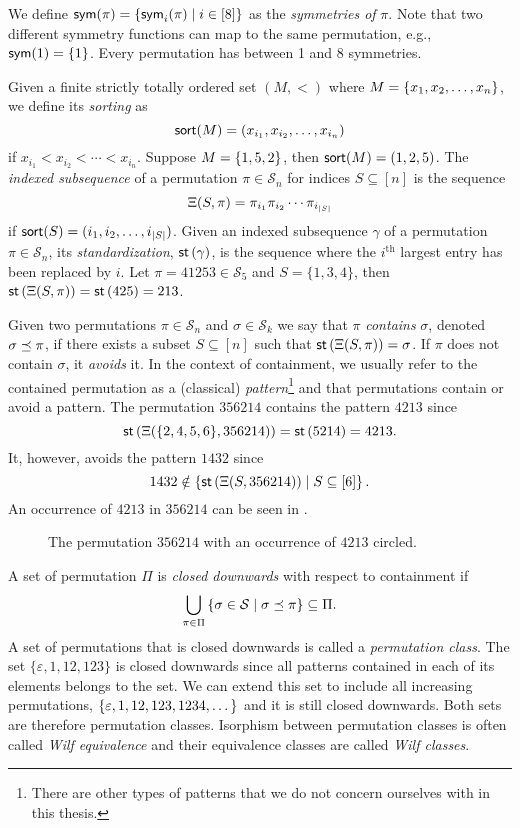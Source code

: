 We define $\textsf{sym}(\pi) = \left\{\textsf{sym}_i(\pi) \mid i \in [8]\right\}$ as the \emph{symmetries of} $\pi$. Note that two different symmetry functions can map to the same permutation, e.g., $\textsf{sym}(1) = \left\{1\right\}$. Every permutation has between 1 and 8 symmetries.

Given a finite strictly totally ordered set $(M, <)$ where $M = \left\{x_1,x_2,\dotsc,x_n\right\}$, we define its \emph{sorting} as
\[
    \textsf{sort}(M) = (x_{i_1},x_{i_2},\dotsc,x_{i_n})
\]
if $x_{i_1} < x_{i_2} < \dotsm < x_{i_n}$. Suppose $M=\left\{1,5,2\right\}$, then $\textsf{sort}(M) = (1,2,5)$. The \emph{indexed subsequence} of a permutation $\pi \in \mathcal{S}_n$ for indices $S\subseteq [n]$ is the sequence
\[
    \Xi(S,\pi)=\pi_{i_1} \pi_{i_2} \dotsm \pi_{i_{|S|}}
\]
if $\textsf{sort}(S) = (i_1,i_2,\dotsc,i_{|S|})$. Given an indexed subsequence $\gamma$ of a permutation $\pi \in \mathcal{S}_n$, its \emph{standardization}, $\textsf{st}\left(\gamma\right)$, is the sequence where the $i^\text{th}$ largest entry has been replaced by $i$. Let $\pi = 41253 \in \mathcal{S}_5$ and $S=\{1,3,4\}$, then $\textsf{st}\left(\Xi(S,\pi)\right) = \textsf{st}\left(425\right) = 213$.

Given two permutations $\pi \in \mathcal{S}_n$ and $\sigma \in \mathcal{S}_k$ we say that $\pi$ \emph{contains} $\sigma$, denoted $\sigma \preceq \pi$, if there exists a subset $S \subseteq [n]$ such that $\textsf{st}\left(\Xi(S,\pi)\right) = \sigma$. If $\pi$ does not contain $\sigma$, it \emph{avoids} it. In the context of containment, we usually refer to the contained permutation as a (classical) \emph{pattern}\footnote{There are other types of patterns that we do not concern ourselves with in this thesis.} and that permutations contain or avoid a pattern. The permutation $356214$ contains the pattern $4213$ since
\[
    \textsf{st}\left(\Xi(\{2, 4, 5, 6\},356214)\right) = \textsf{st}\left(5214\right) = 4213.
\]
It, however, avoids the pattern $1432$ since
\[
    1432 \notin \left\{\textsf{st}\left(\Xi(S,356214)\right) \mid S \subseteq [6]\right\}.
\]
An occurrence of $4213$ in $356214$ can be seen in .

\begin{figure}[ht!]
    \centering
    
    \caption{The permutation $356214$ with an occurrence of $4213$ circled.}
    \label{fig:pattern_containment}
\end{figure}

A set of permutation $\Pi$ is \emph{closed downwards} with respect to containment if 
\[
    \bigcup_{\pi \in \Pi}\left\{\sigma \in \mathcal{S} \mid \sigma \preceq \pi\right\} \subseteq \Pi.
\]
A set of permutations that is closed downwards is called a \emph{permutation class}. The set $\{\varepsilon, 1, 12, 123\}$ is closed downwards since all patterns contained in each of its elements belongs to the set. We can extend this set to include all increasing permutations, $\left\{\varepsilon, 1, 12, 123, 1234, \dotsc\right\}$ and it is still closed downwards. Both sets are therefore permutation classes. Isorphism between permutation classes is often called \emph{Wilf equivalence} and their equivalence classes are called \emph{Wilf classes}. 


